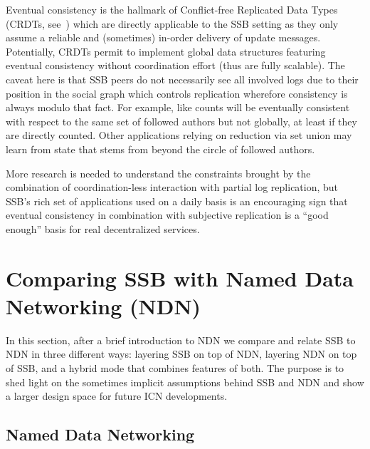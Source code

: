 \documentclass[9pt,sigconf]{acmart}
\begin{document}
Eventual consistency is the hallmark of Conflict-free Replicated Data
Types (CRDTs, see~\cite{shapiro2011conflict}) which are directly
applicable to the SSB setting as they only assume a reliable and
(sometimes) in-order delivery of update messages. Potentially, CRDTs
permit to implement global data structures featuring eventual
consistency without coordination effort (thus are fully scalable). The
caveat here is that SSB peers do not necessarily see all involved logs
due to their position in the social graph which controls replication
wherefore consistency is always modulo that fact. For example, like
counts will be eventually consistent with respect to the same set of
followed authors but not globally, at least if they are directly
counted. Other applications relying on reduction via set union may
learn from state that stems from beyond the circle of followed
authors.

More research is needed to understand the constraints brought by the
combination of coordination-less interaction with partial log
replication, but SSB's rich set of applications used on a daily basis
is an encouraging sign that eventual consistency in combination with
subjective replication is a ``good enough'' basis for real
decentralized services.



\section{Comparing SSB with Named Data Networking (NDN)}
\label{sect:NDN}

In this section, after a brief introduction to NDN we compare and
relate SSB to NDN in three different ways: layering SSB on top of NDN,
layering NDN on top of SSB, and a hybrid mode that combines features
of both. The purpose is to shed light on the sometimes implicit
assumptions behind SSB and NDN and show a larger design space for
future ICN developments.

\subsection{Named Data Networking}
\end{document}
